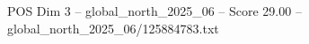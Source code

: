 \begin{textsample}{POS Dim 3 – global\_north\_2025\_06 – Score 29.00 – global\_north\_2025\_06/125884783.txt}
\end{textsample}

